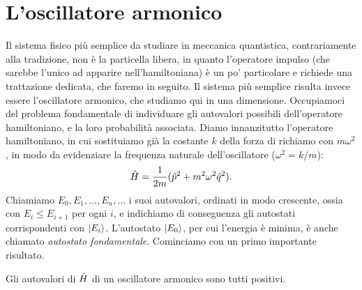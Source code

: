 \chapter{L'oscillatore armonico}
Il sistema fisico più semplice da studiare in meccanica quantistica, contrariamente alla tradizione, non è la particella libera, in quanto l'operatore impulso (che sarebbe l'unico ad apparire nell'hamiltoniana) è un po' particolare e richiede una trattazione dedicata, che faremo in seguito.
Il sistema più semplice risulta invece essere l'oscillatore armonico, che studiamo qui in una dimensione.
Occupiamoci del problema fondamentale di individuare gli autovalori possibili dell'operatore hamiltoniano, e la loro probabilità associata.
Diamo innanzitutto l'operatore hamiltoniano, in cui sostituiamo già la costante $k$ della forza di richiamo con $m\omega^2$, in modo da evidenziare la frequenza naturale dell'oscillatore ($\omega^2=k/m$):
\begin{equation}
	\hat{H}=\frac1{2m}(\hat{p}^2+m^2\omega^2\hat{q}^2).
	\label{eq:H-oscillatore}
\end{equation}
Chiamiamo $E_0,E_1,\dots,E_n,\dots$ i suoi autovalori, ordinati in modo crescente, ossia con $E_i\leq E_{i+1}$ per ogni $i$, e indichiamo di conseguenza gli autostati corrispondenti con $\left|{E_i}\right\rangle$.
L'autostato $\left|{E_0}\right\rangle$, per cui l'energia è minima, è anche chiamato \emph{autostato fondamentale}.
Cominciamo con un primo importante risultato.
\begin{teorema} \label{t:oscillatore-autovalori-positivi}
	Gli autovalori di $\hat{H}$ di un oscillatore armonico sono tutti positivi.
\end{teorema}
